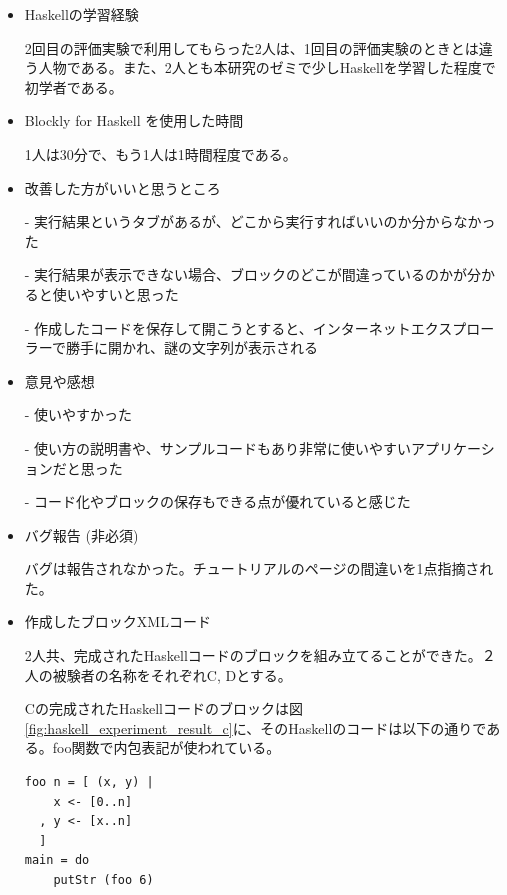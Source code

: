 \documentclass{risepaper}
\begin{document}
\begin{itemize}
\item Haskellの学習経験

2回目の評価実験で利用してもらった2人は、1回目の評価実験のときとは違う人物である。また、2人とも本研究のゼミで少しHaskellを学習した程度で初学者である。

\item Blockly for Haskell を使用した時間

1人は30分で、もう1人は1時間程度である。

\item 改善した方がいいと思うところ

- 実行結果というタブがあるが、どこから実行すればいいのか分からなかった

- 実行結果が表示できない場合、ブロックのどこが間違っているのかが分かると使いやすいと思った

- 作成したコードを保存して開こうとすると、インターネットエクスプローラーで勝手に開かれ、謎の文字列が表示される

\item 意見や感想

- 使いやすかった

- 使い方の説明書や、サンプルコードもあり非常に使いやすいアプリケーションだと思った

- コード化やブロックの保存もできる点が優れていると感じた

\item バグ報告 (非必須)

バグは報告されなかった。チュートリアルのページの間違いを1点指摘された。

\item 作成したブロックXMLコード

2人共、完成されたHaskellコードのブロックを組み立てることができた。２人の被験者の名称をそれぞれC, Dとする。

Cの完成されたHaskellコードのブロックは図\ref{fig:haskell_experiment_result_c}に、そのHaskellのコードは以下の通りである。foo関数で内包表記が使われている。
\begin{lstlisting}[basicstyle=\ttfamily\footnotesize]
foo n = [ (x, y) |
    x <- [0..n]
  , y <- [x..n]
  ]
main = do
    putStr (foo 6)
\end{lstlisting}


\end{itemize}
\end{document}
